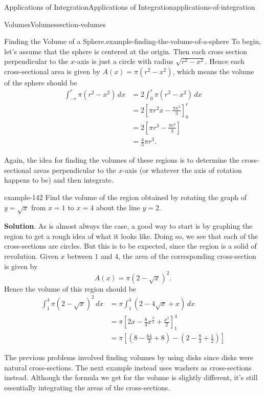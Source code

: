 \documentclass[oneside,10pt,]{book}
\numberwithin{equation}{section}
\newcommand{\amp}{&}
\begin{document}
\begin{chapterptx}{Applications of Integration}{}{Applications of Integration}{}{}{applications-of-integration}
\begin{sectionptx}{Volumes}{}{Volumes}{}{}{section-volumes}
\begin{example}{Finding the Volume of a Sphere.}{example-finding-the-volume-of-a-sphere}
\hypertarget{p-631}{}%
To begin, let's assume that the sphere is centered at the origin. Then each cross section perpendicular to the \(x\)-axis is just a circle with radius \(\sqrt{r^{2} - x^{2}}\). Hence each cross-sectional area is given by \(A(x) = \pi(r^{2} - x^{2})\), which means the volume of the sphere should be%
\begin{align*}
\int_{-r}^{r}\pi(r^{2} - x^{2})\,dx \amp= 2\int_{0}^{r}\pi(r^{2} - x^{2})\,dx\\
\amp= 2\left[\pi r^{2}x - \frac{\pi x^{3}}{3}\right]_{0}^{r}\\
\amp= 2\left[\pi r^{3} - \frac{\pi r^{3}}{3}\right]\\
\amp= \frac{4}{3}\pi r^{3}.
\end{align*}
%
\end{example}
\hypertarget{p-632}{}%
Again, the idea for finding the volumes of these regions is to determine the cross-sectional areas perpendicular to the \(x\)-axis (or whatever the axis of rotation happens to be) and then integrate.%
\begin{example}{}{example-142}%
\hypertarget{p-633}{}%
Find the volume of the region obtained by rotating the graph of \(y = \sqrt{x}\) from \(x = 1\) to \(x = 4\) about the line \(y = 2\).%
\par\smallskip%
\noindent\textbf{Solution}.\hypertarget{solution-138}{}\quad%
\hypertarget{p-634}{}%
As is almost always the case, a good way to start is by graphing the region to get a rough idea of what it looks like. Doing so, we see that each of the cross-sections are circles. But this is to be expected, since the region is a solid of revolution. Given \(x\) between \(1\) and \(4\), the area of the corresponding cross-section is given by%
\begin{equation*}
A(x) = \pi(2 - \sqrt{x})^{2}.
\end{equation*}
Hence the volume of this region should be%
\begin{align*}
\int_{1}^{4}\pi(2 - \sqrt{x})^{2}\,dx \amp= \pi\int_{1}^{4}(2 - 4\sqrt{x} + x)\,dx\\
\amp= \pi\left[2x - \frac{8}{3}x^{\frac{3}{2}} + \frac{x^{2}}{2}\right]_{1}^{4}\\
\amp= \pi\left[\left(8 - \frac{64}{3} + 8\right) - \left(2 - \frac{8}{3} + \frac{1}{2}\right)\right]
\end{align*}
%
\end{example}
\hypertarget{p-635}{}%
The previous problems involved finding volumes by using disks since disks were natural cross-sections. The next example instead uses washers as cross-sections instead. Although the formula we get for the volume is slightly different, it's still essentially integrating the areas of the cross-sections.%

\end{sectionptx}
\end{chapterptx}
\end{document}
